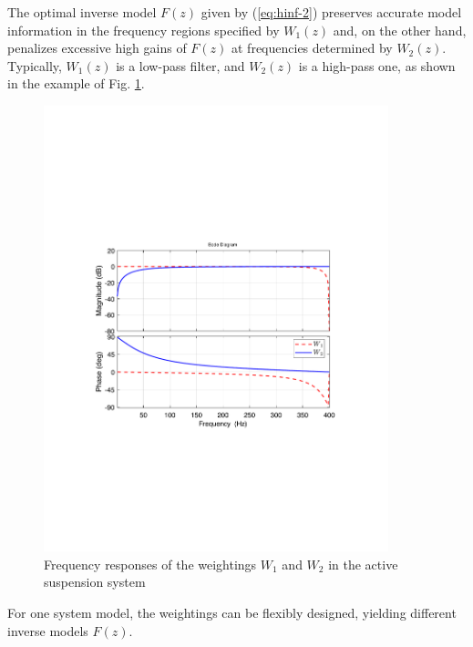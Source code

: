 \documentclass [11pt, proquest] {uwthesis}[2020/02/24]
\begin{document}
\noindent The optimal inverse model $F(z)$ given by (\ref{eq:hinf-2})
preserves accurate model information in the frequency regions specified
by $W_{1}(z)$ and, on the other hand, penalizes excessive high gains
of $F(z)$ at frequencies determined by $W_{2}(z)$. Typically, $W_{1}(z)$
is a low-pass filter, and $W_{2}(z)$ is a high-pass one, as shown
in the example of Fig. \ref{fig:Frequency-responseW1W2}. 
\begin{figure}
\begin{centering}
\includegraphics[width=10cm]{Model-inversion/W1W2}
\par\end{centering}
\caption{\label{fig:Frequency-responseW1W2}Frequency responses of the weightings
$W_{1}$ and $W_{2}$ in the active suspension system}
\end{figure}
For one system model, the weightings can be flexibly designed, yielding
different inverse models $F(z)$.
\end{document}
